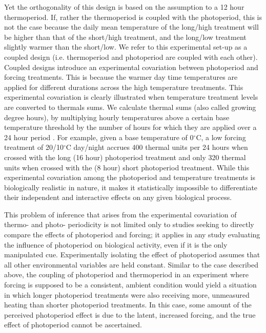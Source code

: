 \documentclass[11pt]{article}
\begin{document}
Yet the orthogonality of this design is based on the assumption to a 12 hour thermoperiod. If, rather the thermoperiod is coupled with the photoperiod, this is not the case because the daily mean temperature of the long/high treatment will be higher than that of the short/high treatment, and the long/low treatment slightly warmer than the short/low. We refer to this experimental set-up as a coupled design (i.e. thermoperiod and photoperiod are coupled with each other).  %
Coupled designs introduce an experimental covariation between photoperiod and forcing treatments. This is because the warmer day time temperatures are applied for different durations across the high temperature treatments. This experimental covariation is clearly illustrated when temperature treatment levels are converted to thermals sums. We calculate thermal sums (also called growing degree hours), by multiplying hourly temperatures above a certain base temperature threshold by the number of hours for which they are applied over a 24 hour period \citep{Parent:2019ug}. For example, given a base temperature of 0$^{\circ}$C, a low forcing treatment of 20/10$^{\circ}$C day/night accrues 400 thermal units per 24 hours  when crossed with the long (16 hour) photoperiod treatment and only 320 thermal units when crossed with the (8 hour) short photoperiod treatment. While this experimental covariation among the photoperiod and temperature treatments is biologically realistic in nature, it makes it statistically impossible to differentiate their independent and interactive effects on any given biological process.

This problem of inference that arises from the experimental covariation of thermo- and photo- periodicity is not limited only to studies seeking to directly compare the effects of photoperiod and forcing; it applies in any study evaluating the influence of photoperiod on biological activity, even if it is the only manipulated cue. Experimentally isolating the effect of photoperiod assumes that all other environmental variables are held constant.  Similar to the case described above, %
the coupling of photoperiod and thermoperiod in an experiment where forcing is supposed to be a consistent, ambient condition would yield a situation in which longer photoperiod treatments were also receiving more, unmeasured heating than shorter photoperiod treatments. In this case, some amount of the perceived photoperiod effect is due to the latent, increased forcing, and the true effect of photoperiod cannot be ascertained.
\end{document}
